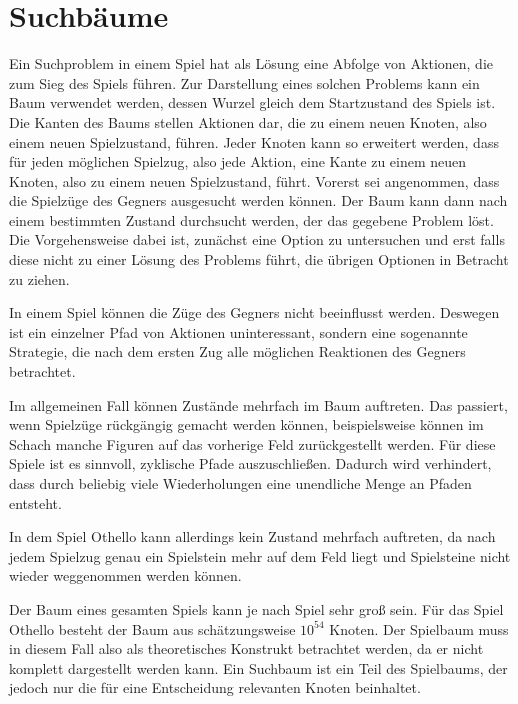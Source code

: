\section{Suchbäume}


Ein Suchproblem in einem Spiel hat als Lösung eine Abfolge von Aktionen, die zum Sieg des Spiels führen. Zur Darstellung
eines solchen Problems kann ein Baum verwendet werden, dessen Wurzel gleich dem Startzustand des Spiels ist. Die Kanten
des Baums stellen Aktionen dar, die zu einem neuen Knoten, also einem neuen Spielzustand, führen. Jeder Knoten kann so
erweitert werden, dass für jeden möglichen Spielzug, also jede Aktion, eine Kante zu einem neuen Knoten, also zu einem
neuen Spielzustand, führt. Vorerst sei angenommen, dass die Spielzüge des Gegners ausgesucht werden können. Der Baum
kann dann nach einem bestimmten Zustand durchsucht werden, der das gegebene Problem löst. Die Vorgehensweise dabei ist,
zunächst eine Option zu untersuchen und erst falls diese nicht zu einer Lösung des Problems führt, die übrigen Optionen
in Betracht zu ziehen.
\cite[S.~75]{ai2010russel}

In einem Spiel können die Züge des Gegners nicht beeinflusst werden. Deswegen ist ein einzelner Pfad von Aktionen
uninteressant, sondern eine sogenannte Strategie, die nach dem ersten Zug alle möglichen Reaktionen des Gegners
betrachtet.
\cite[S.~163]{ai2010russel}

Im allgemeinen Fall können Zustände mehrfach im Baum auftreten. Das passiert, wenn Spielzüge rückgängig gemacht werden
können, beispielsweise können im Schach manche Figuren auf das vorherige Feld zurückgestellt werden. Für diese Spiele
ist es sinnvoll, zyklische Pfade auszuschließen. %
Dadurch wird verhindert, dass durch beliebig
viele Wiederholungen eine unendliche Menge an Pfaden entsteht.
\cite[S.~75]{ai2010russel}

In dem Spiel Othello kann allerdings kein Zustand mehrfach auftreten, da nach jedem Spielzug genau ein Spielstein mehr
auf dem Feld liegt und Spielsteine nicht wieder weggenommen werden können.

Der Baum eines gesamten Spiels kann je nach Spiel sehr groß sein. Für das Spiel Othello besteht der Baum aus
schätzungsweise $10^{54}$ Knoten. %
Der Spielbaum muss in diesem Fall also als theoretisches Konstrukt betrachtet werden, da er nicht komplett dargestellt
werden kann. Ein Suchbaum ist ein Teil des Spielbaums, der jedoch nur die für eine Entscheidung relevanten Knoten
beinhaltet.
\cite[S.~162f.]{ai2010russel}

